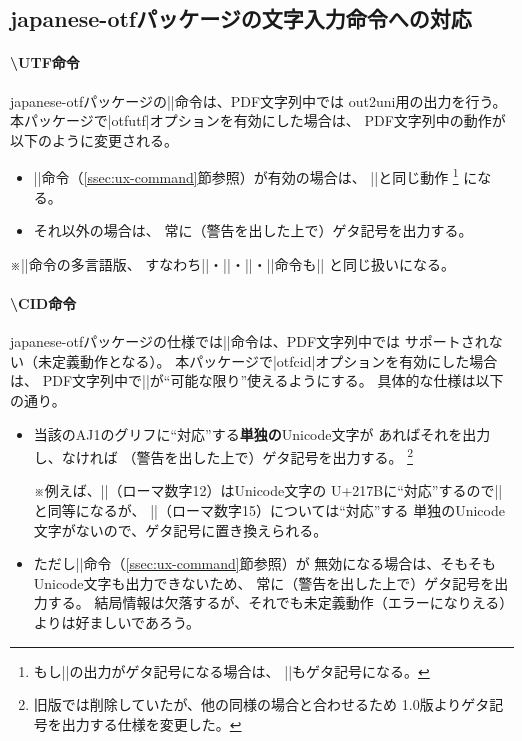 \documentclass[uplatex,dvipdfmx,a4paper]{jsarticle}
\newcommand{\Pkg}[1]{\textsf{#1}}
\newcommand{\Note}{\par\noindent ※}
\begin{document}
\subsection{\Pkg{japanese-otf}パッケージの文字入力命令への対応}
\label{ssec:otf-package}

\paragraph{\textbackslash UTF命令}
\Pkg{japanese-otf}パッケージの|\UTF|命令は、PDF文字列中では
out2uni用の出力を行う。
本パッケージで|otfutf|オプションを有効にした場合は、
PDF文字列中の動作が以下のように変更される。

\begin{itemize}
\item |\Ux|命令（\ref{ssec:ux-command}節参照）が有効の場合は、
  |\Ux|と同じ動作
  \footnote{もし|\Ux|の出力がゲタ記号になる場合は、
    |\UTF|もゲタ記号になる。}%
  になる。
\item それ以外の場合は、
  常に（警告を出した上で）ゲタ記号を出力する。
\end{itemize}

\Note |\UTF|命令の多言語版、
すなわち|\UTFC|・|\UTFK|・|\UTFM|・|\UTFT|命令も|\UTF|%
と同じ扱いになる。

\paragraph{\textbackslash CID命令}
\Pkg{japanese-otf}パッケージの仕様では|\CID|命令は、PDF文字列中では
サポートされない（未定義動作となる）。
本パッケージで|otfcid|オプションを有効にした場合は、
PDF文字列中で|\CID|が“可能な限り”使えるようにする。
具体的な仕様は以下の通り。

\begin{itemize}
\item 当該のAJ1のグリフに“対応”する\textbf{単独の}Unicode文字が
  あればそれを出力し、なければ
  （警告を出した上で）ゲタ記号を出力する。
  \footnote{旧版では削除していたが、他の同様の場合と合わせるため
    1.0版よりゲタ記号を出力する仕様を変更した。}
  \Note 例えば、||（ローマ数字12）はUnicode文字の
  U+217Bに“対応”するので||と同等になるが、
  ||（ローマ数字15）については“対応”する
  単独のUnicode文字がないので、ゲタ記号に置き換えられる。
\item ただし|\Ux|命令（\ref{ssec:ux-command}節参照）が
  無効になる場合は、そもそもUnicode文字も出力できないため、
  常に（警告を出した上で）ゲタ記号を出力する。
  結局情報は欠落するが、それでも未定義動作（エラーになりえる）
  よりは好ましいであろう。
\end{itemize}
\end{document}
